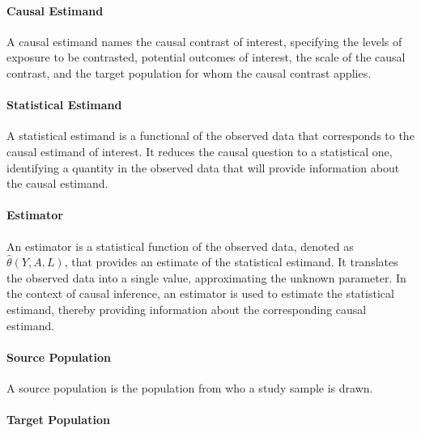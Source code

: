 \documentclass[
  singlecolumn]{article}
\let\oldparagraph\paragraph
\renewcommand{\paragraph}[1]{\oldparagraph{#1}\mbox{}}
\begin{document}
\paragraph{\texorpdfstring{\textbf{Causal
Estimand}}{Causal Estimand}}\label{causal-estimand}

A causal estimand names the causal contrast of interest, specifying the
levels of exposure to be contrasted, potential outcomes of interest, the
scale of the causal contrast, and the target population for whom the
causal contrast applies.

\paragraph{\texorpdfstring{\textbf{Statistical
Estimand}}{Statistical Estimand}}\label{statistical-estimand}

A statistical estimand is a functional of the observed data that
corresponds to the causal estimand of interest. It reduces the causal
question to a statistical one, identifying a quantity in the observed
data that will provide information about the causal estimand.

\paragraph{\texorpdfstring{\textbf{Estimator}}{Estimator}}\label{estimator}

An estimator is a statistical function of the observed data, denoted as
\(\hat{\theta}(Y, A, L)\), that provides an estimate of the statistical
estimand. It translates the observed data into a single value,
approximating the unknown parameter. In the context of causal inference,
an estimator is used to estimate the statistical estimand, thereby
providing information about the corresponding causal estimand.

\paragraph{\texorpdfstring{\textbf{Source
Population}}{Source Population}}\label{source-population}

A source population is the population from who a study sample is drawn.

\paragraph{\texorpdfstring{\textbf{Target
Population}}{Target Population}}\label{target-population}
\end{document}
